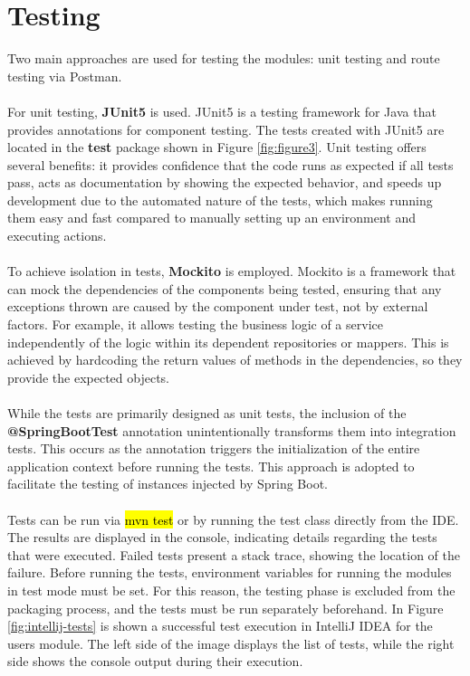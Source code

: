 \section{Testing}

Two main approaches are used for testing the modules: unit testing and route testing via Postman.
\\\\
\noindent For unit testing, \textbf{JUnit5} \cite{junit5} is used. JUnit5 is a testing framework for Java that provides annotations for component testing. The tests created with JUnit5 are located in the \textbf{test} package shown in Figure \ref{fig:figure3}. Unit testing offers several benefits: it provides confidence that the code runs as expected if all tests pass, acts as documentation by showing the expected behavior, and speeds up development due to the automated nature of the tests, which makes running them easy and fast compared to manually setting up an environment and executing actions.
\\\\
\noindent To achieve isolation in tests, \textbf{Mockito} \cite{baeldung-mockito} is employed. Mockito is a framework that can mock the dependencies of the components being tested, ensuring that any exceptions thrown are caused by the component under test, not by external factors. For example, it allows testing the business logic of a service independently of the logic within its dependent repositories or mappers. This is achieved by hardcoding the return values of methods in the dependencies, so they provide the expected objects.
\\\\
\noindent While the tests are primarily designed as unit tests, the inclusion of the \textbf{@SpringBootTest} annotation unintentionally transforms them into integration tests. This occurs as the annotation triggers the initialization of the entire application context before running the tests. This approach is adopted to facilitate the testing of instances injected by Spring Boot.
\\\\
\noindent Tests can be run via \hl{mvn test} or by running the test class directly from the IDE. The results are displayed in the console, indicating details regarding the tests that were executed. Failed tests present a stack trace, showing the location of the failure. Before running the tests, environment variables for running the modules in test mode must be set. For this reason, the testing phase is excluded from the packaging process, and the tests must be run separately beforehand. In Figure \ref{fig:intellij-tests} is shown a successful test execution in IntelliJ IDEA for the users module. The left side of the image displays the list of tests, while the right side shows the console output during their execution.

